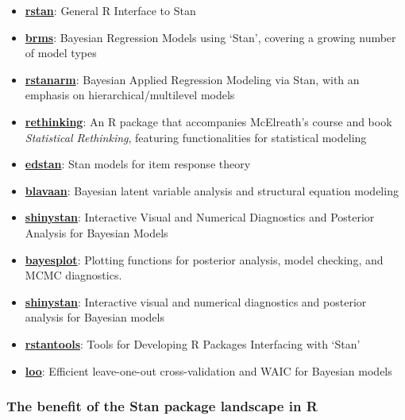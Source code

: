 \documentclass[
  11pt,
]{article}
\providecommand{\tightlist}{%
  \setlength{\itemsep}{0pt}\setlength{\parskip}{0pt}}
\begin{document}
\begin{itemize}
\tightlist
\item
  \href{https://cran.r-project.org/package=rstan}{\textbf{rstan}}: General R Interface to Stan
\item
  \href{https://cran.r-project.org/package=brms}{\textbf{brms}}: Bayesian Regression Models using `Stan', covering a growing number of model types
\item
  \href{https://cran.r-project.org/package=rstanarm}{\textbf{rstanarm}}: Bayesian Applied Regression Modeling via Stan, with an emphasis on hierarchical/multilevel models
\item
  \href{https://www.rdocumentation.org/packages/rethinking/versions/2.13}{\textbf{rethinking}}: An R package that accompanies McElreath's course and book \emph{Statistical Rethinking}, featuring functionalities for statistical modeling
\item
  \href{https://cran.r-project.org/package=edstan}{\textbf{edstan}}: Stan models for item response theory
\item
  \href{https://cran.r-project.org/web/packages/blavaan/index.html}{\textbf{blavaan}}: Bayesian latent variable analysis and structural equation modeling
\item
  \href{https://cran.r-project.org/package=shinystan}{\textbf{shinystan}}: Interactive Visual and Numerical Diagnostics and Posterior Analysis for Bayesian Models
\item
  \href{https://cran.r-project.org/web/packages/bayesplot/index.html}{\textbf{bayesplot}}: Plotting functions for posterior analysis, model checking, and MCMC diagnostics.
\item
  \href{https://cran.r-project.org/web/packages/shinystan/index.html}{\textbf{shinystan}}: Interactive visual and numerical diagnostics and posterior analysis for Bayesian models
\item
  \href{https://cran.r-project.org/package=rstantools}{\textbf{rstantools}}: Tools for Developing R Packages Interfacing with `Stan'
\item
  \href{https://cran.r-project.org/web/packages/loo/index.html}{\textbf{loo}}: Efficient leave-one-out cross-validation and WAIC for Bayesian models
\end{itemize}

\hypertarget{the-benefit-of-the-stan-package-landscape-in-r}{%
\subsubsection{The benefit of the Stan package landscape in R}\label{the-benefit-of-the-stan-package-landscape-in-r}}
\end{document}

